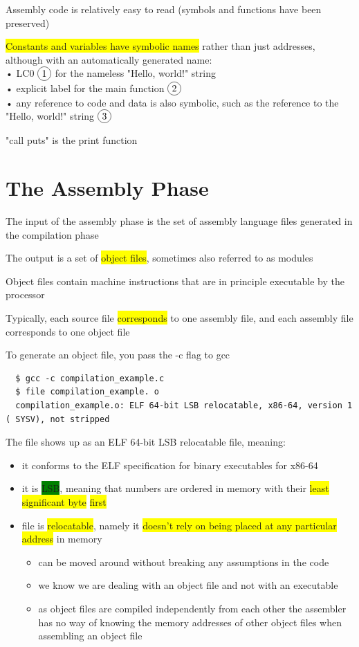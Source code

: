 \documentclass[]{project_plan}
\newcommand*\circled[1]{\tikz[baseline=(char.base)]{
            \node[shape=circle,draw,inner sep=2pt] (char) {#1};}}
\begin{document}
Assembly code is relatively easy to read
(symbols and functions have been preserved)

\colorbox{yellow}{Constants and variables have symbolic names} rather than just addresses,
although with an automatically generated name:\\
• LC0 $\circled{1}$ for the nameless "Hello, world!" string\\
• explicit label for the main function $\circled{2}$\\
• any reference to code and data is also symbolic, such as the reference to the "Hello, world!" string $\circled{3}$

"call puts"  is the print function

\section{The Assembly Phase}

The input of the assembly phase is the set of assembly language files generated
in the compilation phase

The output is a set of \colorbox{yellow}{object files}, sometimes also referred to as modules

Object files contain machine instructions that are in principle executable
by the processor

Typically, each source file \colorbox{yellow}{corresponds} to one assembly file, and each
assembly file corresponds to one object file

To generate an object file, you pass the -c flag to gcc

\begin{lstlisting}
  $ gcc -c compilation_example.c
  $ file compilation_example. o
  compilation_example.o: ELF 64-bit LSB relocatable, x86-64, version 1 ( SYSV), not stripped
\end{lstlisting}

The file shows up as an ELF 64-bit LSB relocatable file, meaning:
\begin{itemize}
  \item it conforms to the ELF specification for binary executables for x86-64
  \item it is \colorbox{green}{LSB}, meaning that numbers are ordered in memory with their \colorbox{yellow}{least significant byte} \colorbox{yellow}{first}
  \item file is \colorbox{yellow}{relocatable}, namely it \colorbox{yellow}{doesn’t rely on being placed at any particular address} in memory
        \begin{itemize}
          \item can be moved around without breaking any assumptions in the code
          \item we know we are dealing with an object file and not with an executable
          \item as object files are compiled independently from each other
                the assembler has no way of knowing the memory addresses of other
                object files when assembling an object file
        \end{itemize}
\end{itemize}
\end{document}

